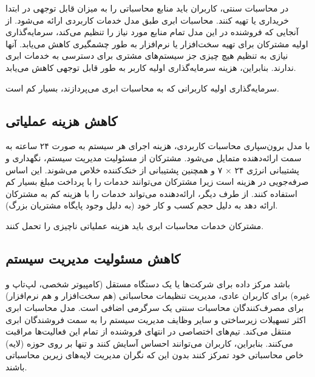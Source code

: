 \documentclass{book}
\begin{document}
                در محاسبات سنتی، کاربران باید منابع محاسباتی را به میزان قابل توجهی در ابتدا خریداری یا تهیه کنند. محاسبات ابری طبق مدل خدمات کاربردی ارائه می‌شود. از آنجایی که فروشنده در این مدل تمام منابع مورد نیاز را تنظیم می‌کند، سرمایه‌گذاری اولیه مشترکان برای تهیه سخت‌افزار یا نرم‌افزار به طور چشمگیری کاهش می‌یابد. آنها نیازی به تنظیم هیچ چیزی جز سیستم‌های مشتری برای دسترسی به خدمات ابری ندارند. بنابراین، هزینه سرمایه‌گذاری اولیه کاربر به طور قابل توجهی کاهش می‌یابد.

                \begin{addinfo}
                    
                    سرمایه‌گذاری اولیه کاربرانی که به محاسبات ابری می‌پردازند، بسیار کم است.

                \end{addinfo}

            \subsection{کاهش هزینه عملیاتی}

                با مدل برون‌سپاری محاسبات کاربردی، هزینه اجرای هر سیستم به صورت ۲۴ ساعته به سمت ارائه‌دهنده متمایل می‌شود. مشترکان از مسئولیت مدیریت سیستم، نگهداری و پشتیبانی انرژی ۲۴ × ۷ و همچنین پشتیبانی از خنک‌کننده خلاص می‌شوند. این اساس صرفه‌جویی در هزینه است زیرا مشترکان می‌توانند خدمات را با پرداخت مبلغ بسیار کم استفاده کنند. از طرف دیگر، ارائه‌دهنده می‌تواند خدمات را با هزینه کم به مشترکان ارائه دهد به دلیل حجم کسب و کار خود (به دلیل وجود پایگاه مشتریان بزرگ).

                \begin{addinfo}
                    
                    مشترکان خدمات محاسبات ابری باید هزینه عملیاتی ناچیزی را تحمل کنند.

                \end{addinfo}

            \subsection{کاهش مسئولیت مدیریت سیستم}

                باشد مرکز داده برای شرکت‌ها یا یک دستگاه مستقل (کامپیوتر شخصی، لپ‌تاپ و غیره) برای کاربران عادی، مدیریت تنظیمات محاسباتی (هم سخت‌افزار و هم نرم‌افزار) برای مصرف‌کنندگان محاسبات سنتی یک سرگرمی اضافی است. مدل محاسبات ابری اکثر تسهیلات زیرساختی و سایر وظایف مدیریت سیستم را به سمت فروشندگان ابری منتقل می‌کند. تیم‌های اختصاصی در انتهای فروشنده از تمام این فعالیت‌ها مراقبت می‌کنند. بنابراین، کاربران می‌توانند احساس آسایش کنند و تنها بر روی حوزه (لایه) خاص محاسباتی خود تمرکز کنند بدون این که نگران مدیریت لایه‌های زیرین محاسباتی باشند.
\end{document}
